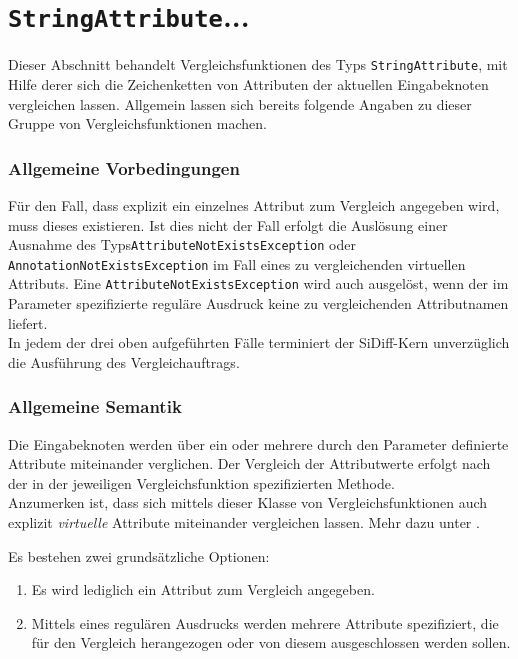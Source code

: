 %
%

\section{\texttt{StringAttribute}...}
\label{strct:spec:stringattr}
Dieser Abschnitt behandelt Vergleichsfunktionen des Typs \texttt{StringAttribute}, mit Hilfe derer sich die Zeichenketten von Attributen der aktuellen Eingabeknoten vergleichen lassen. Allgemein lassen sich bereits folgende Angaben zu dieser Gruppe von Vergleichsfunktionen machen.

\subsubsection*{Allgemeine Vorbedingungen}
Für den Fall, dass explizit ein einzelnes Attribut zum Vergleich angegeben wird, muss dieses existieren. Ist dies nicht der Fall erfolgt die Auslösung einer Ausnahme des Typs\mylinebreak\texttt{AttributeNotExistsException} oder \texttt{AnnotationNotExistsException} im Fall eines zu vergleichenden virtuellen Attributs. Eine \texttt{AttributeNotExistsException} wird auch ausgelöst, wenn der im Parameter spezifizierte reguläre Ausdruck keine zu vergleichenden Attributnamen liefert.\\
In jedem der drei oben aufgeführten Fälle terminiert der SiDiff-Kern unverzüglich die Ausführung des Vergleichauftrags.

\subsubsection*{Allgemeine Semantik}
Die Eingabeknoten werden über ein oder mehrere durch den Parameter definierte Attribute miteinander verglichen. Der Vergleich der Attributwerte erfolgt nach der in der jeweiligen Vergleichsfunktion spezifizierten Methode.\\
Anzumerken ist, dass sich mittels dieser Klasse von Vergleichsfunktionen auch explizit \emph{virtuelle} Attribute miteinander vergleichen lassen. Mehr dazu unter .

Es bestehen zwei grundsätzliche Optionen:
\begin{enumerate}
	\item Es wird lediglich ein Attribut zum Vergleich angegeben.
	\item Mittels eines regulären Ausdrucks werden mehrere Attribute spezifiziert, die für den Vergleich herangezogen oder von diesem ausgeschlossen werden sollen.
\end{enumerate}

